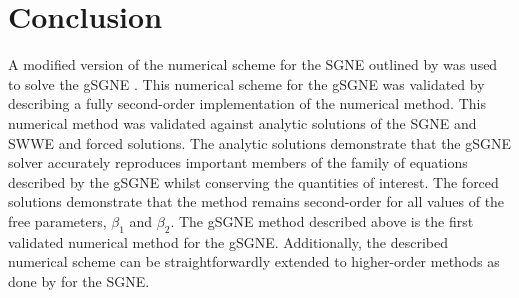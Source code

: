 \documentclass[10pt]{elsarticle}
\begin{document}
\section{Conclusion}
A modified version of the numerical scheme for the SGNE outlined by \citet{Zoppou-etal-2017} was used to solve the gSGNE \cite{Clamond-Dutykh-2018-237,Clamond-et.al-2017-245}. This numerical scheme for the gSGNE was validated by describing a fully second-order implementation of the numerical method. This numerical method was validated against analytic solutions of the SGNE and SWWE and forced solutions. The analytic solutions demonstrate that the gSGNE solver accurately reproduces important members of the family of equations described by the gSGNE whilst conserving the quantities of interest. The forced solutions demonstrate that the method remains second-order for all values of the free parameters, $\beta_1$ and $\beta_2$. The gSGNE method described above is the first validated numerical method for the gSGNE. Additionally, the described numerical scheme can be straightforwardly extended to higher-order methods as done by \citet{Zoppou-etal-2017} for the SGNE.



\end{document}

